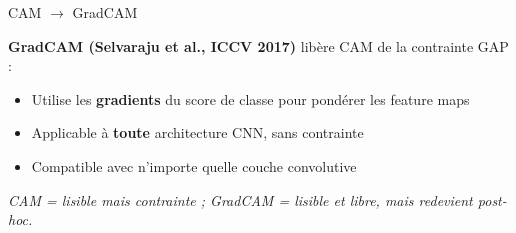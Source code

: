 \documentclass[10pt]{beamer}
\begin{document}
\begin{frame}{CAM $\to$ GradCAM}
  \begin{plusbox}
    \textbf{GradCAM (Selvaraju et al., ICCV 2017)} libère CAM de la contrainte GAP :
    \begin{itemize}
      \item Utilise les \textbf{gradients} du score de classe pour pondérer les feature maps
      \item Applicable à \textbf{toute} architecture CNN, sans contrainte
      \item Compatible avec n'importe quelle couche convolutive
    \end{itemize}
    \vspace{2pt}\centering
    \emph{CAM = lisible mais contrainte ; GradCAM = lisible et libre, mais redevient post-hoc.}
  \end{plusbox}
\end{frame}
\end{document}
